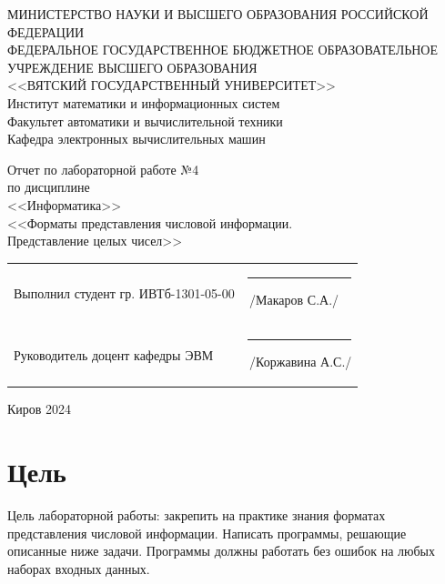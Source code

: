 \documentclass[a4paper,14pt]{extarticle}
\begin{document}
  \newpage\thispagestyle{empty}
  \begin{center}
    \MakeUppercase{
      Министерство науки и высшего образования Российской Федерации\\
      Федеральное государственное бюджетное образовательное учреждение высшего образования\\
      <<Вятский Государственный Университет>>\\
    }
    Институт математики и информационных систем\\
    Факультет автоматики и вычислительной техники\\
    Кафедра электронных вычислительных машин
  \end{center}
  \vfill

  \begin{center}
    Отчет по лабораторной работе №4\\
    по дисциплине\\
    <<Информатика>>\\
    <<Форматы представления числовой информации.\\Представление целых чисел>>
  \end{center}
  \vfill

  \noindent
  \begin{tabular}{ll}
    Выполнил студент гр. ИВТб-1301-05-00 \hspace{5mm} &
    \rule[-1mm]{25mm}{0.10mm}\,/Макаров С.А./\\
    
    Руководитель доцент кафедры ЭВМ & \rule[-1mm]{25mm}{0.10mm}\,/Коржавина А.С./\\
  \end{tabular}

  \vfill
  \begin{center}
    Киров 2024
  \end{center}

  \newpage
  \section*{Цель}
  Цель лабораторной работы: закрепить на практике знания форматах представления числовой информации. Написать программы, решающие описанные ниже задачи. Программы должны работать без ошибок на любых наборах входных данных.
\end{document}
